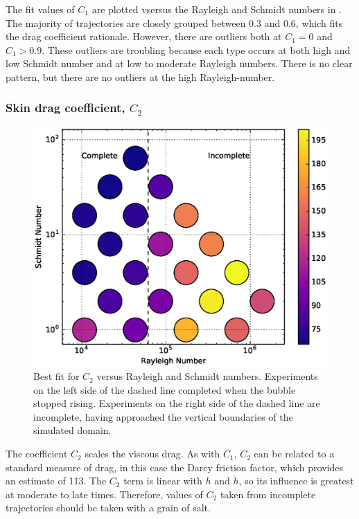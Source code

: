 The fit values of $C_1$ are plotted vsersus the Rayleigh and Schmidt numbers in .
The majority of trajectories are closely grouped between $0.3$ and $0.6$, which fits the drag coefficient rationale.
However, there are outliers both at $C_1 = 0$ and $C_1 > 0.9$.
These outliers are troubling because each type occurs at both high and low Schmidt number and at low to moderate Rayleigh numbers.
There is no clear pattern, but there are no outliers at the high Rayleigh-number.

\subsubsection{Skin drag coefficient, $C_2$}
\begin{figure}
\includegraphics[width=\columnwidth]{figs/C2-vs-Rayleigh-Schmidt}
\caption{ 
  Best fit for $C_2$ versus Rayleigh and Schmidt numbers.
  Experiments on the left side of the dashed line completed when the bubble stopped rising.
  Experiments on the right side of the dashed line are incomplete, having approached the vertical boundaries of the simulated domain.
}
\end{figure}

The coefficient $C_2$ scales the viscous drag.
As with $C_1$, $C_2$ can be related to a standard measure of drag, in this case the Darcy friction factor, which provides an estimate of 113.
The $C_2$ term is linear with $h$ and $\dot{h}$, so its influence is greatest at moderate to late times.
Therefore, values of $C_2$ taken from incomplete trajectories should be taken with a grain of salt.

